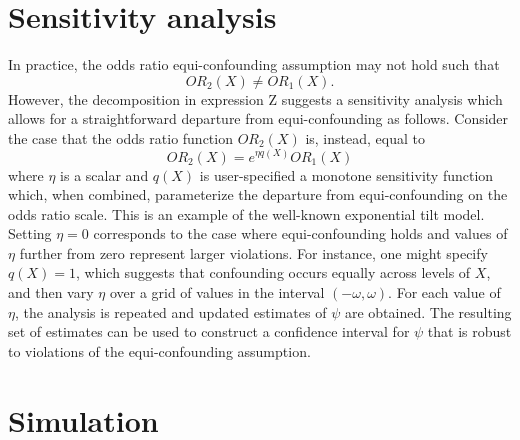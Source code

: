 \documentclass[11pt]{article}
\begin{document}
\section{Sensitivity analysis}
In practice, the odds ratio equi-confounding assumption may not hold such that
$$OR_2(X) \neq OR_1(X).$$ 
However, the decomposition in expression Z suggests a sensitivity analysis which allows for a straightforward departure from equi-confounding as follows. Consider the case that the odds ratio function $OR_2(X)$ is, instead, equal to
$$ OR_2(X) = e^{\eta q(X)} OR_1(X) $$
where $\eta$ is a scalar and $q(X)$ is user-specified a monotone sensitivity function which, when combined, parameterize the departure from equi-confounding on the odds ratio scale. This is an example of the well-known exponential tilt model. Setting $\eta = 0$ corresponds to the case where equi-confounding holds and values of $\eta$ further from zero represent larger violations. For instance, one might specify $q(X) = 1$, which suggests that confounding occurs equally across levels of $X$, and then vary $\eta$ over a grid of values in the interval $(-\omega, \omega)$. For each value of $\eta$, the analysis is repeated and updated estimates of $\psi$ are obtained. The resulting set of estimates can be used to construct a confidence interval for $\psi$ that is robust to violations of the equi-confounding assumption.

\section{Simulation}
\end{document}
